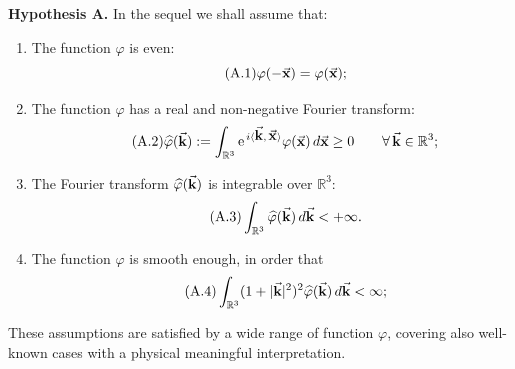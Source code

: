 \documentclass[a4paper,11pt]{article}
\numberwithin{equation}{section}
\newcommand{\RR}{\mathbb{R}^3}
\newcommand{\R}{\mathbb{R}}
\newcommand{\la}{\langle}
\newcommand{\ra}{\rangle}
\renewcommand{\k}{\mbox{$\vec{\bf k}$}}
\newcommand{\x}{\mbox{$\vec{\bf x}$}}
\begin{document}
\vspace{.3cm}
\noindent\textbf{Hypothesis A.} In the sequel we shall assume that:
\begin{enumerate}
\item[-] The function $\varphi$ is even:
  \begin{equation*}\tag{A.1}
    \varphi(-\x)=\varphi(\x);
  \end{equation*}
\item[-] The function $\varphi$ has a real and non-negative Fourier
  transform: 
  \begin{equation*}\tag{A.2}
\widehat \varphi(\k) := \int_{\RR}  \text{e}^{\,i\la \k,\,\x\ra}
\varphi(\x) \,d\x \ge 0\qquad\forall\,\k\in\R^3;
  \end{equation*}
\item[-] The Fourier transform $\widehat{\varphi}(\k)$ is integrable
  over $\R^3$: 
  \begin{equation*}\tag{A.3}
    \int_{\R^3}\widehat{\varphi}(\k)\,d\k<+\infty.
  \end{equation*}
\item[-] The function $\varphi$ is smooth enough, in order that 
\begin{equation*}\tag{A.4}
\int_{\R^3}  (1+|\k|^2)^2 \widehat{\varphi}(\k)\,d\k < \infty; 
  \end{equation*}
\end{enumerate}
These assumptions are satisfied by a wide range of function $\varphi$,
covering also well-known cases with a physical meaningful
interpretation. 
%
\end{document}
